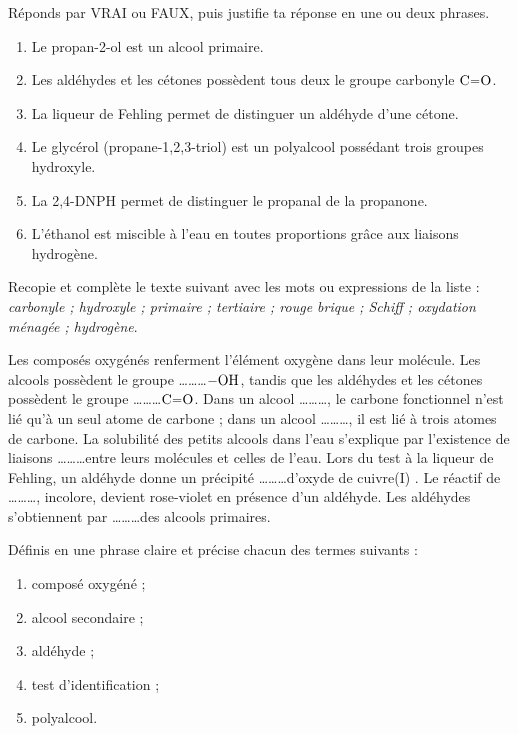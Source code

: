 \documentclass[11pt]{article}
\begin{document}
\begin{exercice}
Réponds par VRAI ou FAUX, puis justifie ta réponse en une ou deux phrases.
\begin{enumerate}
\item Le propan-2-ol est un alcool primaire.
\item Les aldéhydes et les cétones possèdent tous deux le groupe carbonyle $\ce{C=O}$.
\item La liqueur de Fehling permet de distinguer un aldéhyde d'une cétone.
\item Le glycérol (propane-1,2,3-triol) est un polyalcool possédant trois groupes hydroxyle.
\item La 2,4-DNPH permet de distinguer le propanal de la propanone.
\item L'éthanol est miscible à l'eau en toutes proportions grâce aux liaisons hydrogène.
\end{enumerate}
\end{exercice}

\begin{exercice}
Recopie et complète le texte suivant avec les mots ou expressions de la liste : \emph{carbonyle ; hydroxyle ; primaire ; tertiaire ; rouge brique ; Schiff ; oxydation ménagée ; hydrogène}.

Les composés oxygénés renferment l'élément oxygène dans leur molécule. Les alcools possèdent le groupe \ldots\ldots\ldots $-\ce{OH}$, tandis que les aldéhydes et les cétones possèdent le groupe \ldots\ldots\ldots $\ce{C=O}$. Dans un alcool \ldots\ldots\ldots, le carbone fonctionnel n'est lié qu'à un seul atome de carbone ; dans un alcool \ldots\ldots\ldots, il est lié à trois atomes de carbone. La solubilité des petits alcools dans l'eau s'explique par l'existence de liaisons \ldots\ldots\ldots entre leurs molécules et celles de l'eau. Lors du test à la liqueur de Fehling, un aldéhyde donne un précipité \ldots\ldots\ldots d'oxyde de cuivre(I) . Le réactif de \ldots\ldots\ldots, incolore, devient rose-violet en présence d'un aldéhyde. Les aldéhydes s'obtiennent par \ldots\ldots\ldots des alcools primaires.
\end{exercice}

\begin{exercice}[Définitions]
Définis en une phrase claire et précise chacun des termes suivants :
\begin{enumerate}
\item composé oxygéné ;
\item alcool secondaire ;
\item aldéhyde ;
\item test d'identification ;
\item polyalcool.
\end{enumerate}
\end{exercice}
\end{document}
